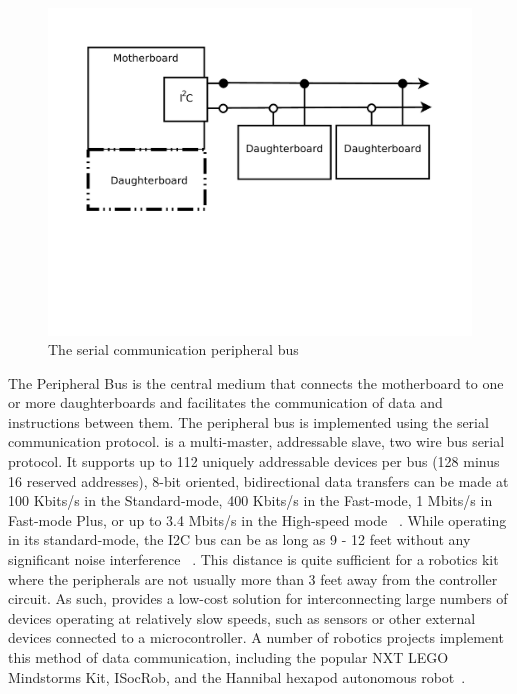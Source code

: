 	\begin{figure}[h]
	  \begin{center}
	    \includegraphics[width=1.0\columnwidth]{Figures/pbus.pdf}
	    \caption{The serial communication peripheral \iic bus}
	  \end{center}
	\end{figure}
	
	The Peripheral Bus is the central medium that connects the motherboard to one or more daughterboards and facilitates the communication of data and instructions between them. The peripheral bus is implemented using the \iic serial communication protocol. \iic is a multi-master, addressable slave, two wire bus serial protocol. It supports up to 112 uniquely addressable devices per bus (128 minus 16 reserved addresses), 8-bit oriented, bidirectional data transfers can be made at 100 Kbits/s in the Standard-mode, 400 Kbits/s in the Fast-mode, 1 Mbits/s in Fast-mode Plus, or up to 3.4 Mbits/s in the High-speed mode ~\parencite{edubots, i2cfaq}. While operating in its standard-mode, the I2C bus can be as long as 9 - 12 feet without any significant noise interference ~\parencite{hannibal}. This distance is quite sufficient for a robotics kit where the peripherals are not usually more than 3 feet away from the controller circuit. As such, \iic provides a low-cost solution for interconnecting large numbers of devices operating at relatively slow speeds, such as sensors or other external devices connected to a microcontroller. A number of robotics projects implement this method of data communication, including the popular NXT LEGO Mindstorms Kit, ISocRob, and the Hannibal hexapod autonomous robot~\parencite{hannibal, Ventura}.
	
